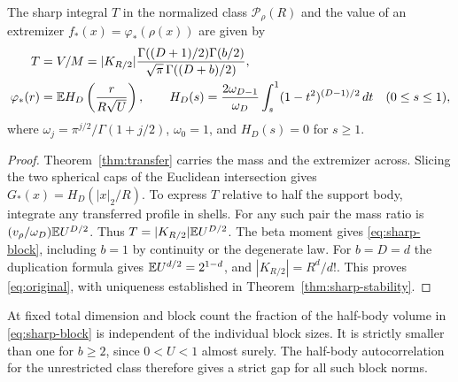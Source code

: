 \documentclass[11pt,a4paper]{article}
\numberwithin{equation}{section}
\begin{document}
\begin{corollary}\label{cor:block}
The sharp integral $T$ in the normalized class $\mathcal P_\rho(R)$ and the value of an extremizer $f_*(x)=\varphi_*(\rho(x))$ are given by
\begin{align}
 T&=V/M=|K_{R/2}|\frac{\Gamma((D+1)/2)\Gamma(b/2)}{\sqrt\pi\,\Gamma((D+b)/2)},\label{eq:sharp-block}\\
 \varphi_*(r)&=\mathbb E H_D\left(\frac{r}{R\sqrt U}\right),\qquad
 H_D(s)=\frac{2\omega_{D-1}}{\omega_D}\int_s^1(1-t^2)^{(D-1)/2}\,dt\quad(0\le s\le1),\label{eq:hat}
\end{align}
where $\omega_j=\pi^{j/2}/\Gamma(1+j/2)$, $\omega_0=1$, and $H_D(s)=0$ for $s\ge1$.
\end{corollary}
\begin{proof}
Theorem~\ref{thm:transfer} carries the mass and the extremizer across. Slicing the two spherical caps of the Euclidean intersection gives $G_*(x)=H_D(|x|_2/R)$. To express $T$ relative to half the support body, integrate any transferred profile in shells. For any such pair the mass ratio is $(v_\rho/\omega_D)\mathbb E U^{D/2}$. Thus $T=|K_{R/2}|\mathbb E U^{D/2}$. The beta moment gives \eqref{eq:sharp-block}, including $b=1$ by continuity or the degenerate law. For $b=D=d$ the duplication formula gives $\mathbb E U^{d/2}=2^{1-d}$, and $|K_{R/2}|=R^d/d!$. This proves \eqref{eq:original}, with uniqueness established in Theorem~\ref{thm:sharp-stability}.
\end{proof}
At fixed total dimension and block count the fraction of the half-body volume in \eqref{eq:sharp-block} is independent of the individual block sizes. It is strictly smaller than one for $b\ge2$, since $0<U<1$ almost surely. The half-body autocorrelation for the unrestricted class therefore gives a strict gap for all such block norms.
\end{document}
